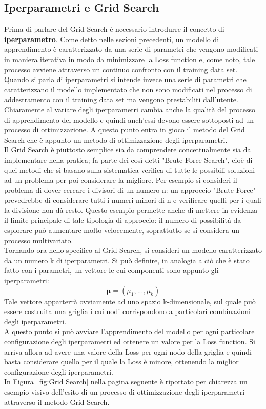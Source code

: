 \newpage

\subsection{Iperparametri e Grid Search}
\label{iperparametri e grid search}

Prima di parlare del Grid Search è necessario introdurre il concetto di \textbf{iperparametro}. Come detto nelle sezioni precedenti, un modello di apprendimento è caratterizzato da una serie di parametri che vengono modificati in maniera iterativa in modo da minimizzare la Loss function e, come noto, tale processo avviene attraverso un continuo confronto con il training data set. Quando si parla di iperparametri si intende invece una serie di parametri che caratterizzano il modello implementato che non sono modificati nel processo di addestramento con il training data set ma vengono prestabiliti dall'utente. \\
Chiaramente al variare degli iperparametri cambia anche la qualità del processo di apprendimento del modello e quindi anch'essi devono essere sottoposti ad un processo di ottimizzazione. A questo punto entra in gioco il metodo del Grid Search che è appunto un metodo di ottimizzazione degli iperparametri. \\
Il Grid Search è piuttosto semplice sia da comprendere concettualmente sia da implementare nella pratica; fa parte dei così detti "Brute-Force Search", cioè di quei metodi che si basano sulla sistematica verifica di tutte le possibili soluzioni ad un problema per poi considerare la migliore. Per esempio si consideri il problema di dover cercare i divisori di un numero n: un approccio "Brute-Force" prevedrebbe di considerare tutti i numeri minori di n e verificare quelli per i quali la divisione non dà resto. Questo esempio permette anche di mettere in evidenza il limite principale di tale tipologia di approccio: il numero di possibilità da esplorare può aumentare molto velocemente, soprattutto se si considera un processo multivariato. \\
Tornando ora nello specifico al Grid Search, si consideri un modello caratterizzato da un numero k di iperparametri. Si può definire, in analogia a ciò che è stato fatto con i parametri, un vettore le cui componenti sono appunto gli iperparametri: 
\begin{equation}
\bm{\mu} = (\mu_1,...,\mu_k)
\end{equation}
Tale vettore apparterrà ovviamente ad uno spazio k-dimensionale, sul quale può essere costruita una griglia i cui nodi corrispondono a particolari combinazioni degli iperparametri. \\
A questo punto si può avviare l'apprendimento del modello per ogni particolare configurazione degli iperparametri ed ottenere un valore per la Loss function. Si arriva allora ad avere una valore della Loss per ogni nodo della griglia e quindi basta considerare quello per il quale la Loss è minore, ottenendo la miglior configurazione degli iperparametri. \\
In Figura~\ref{fig:Grid Search} nella pagina seguente è riportato per chiarezza un esempio visivo dell'esito di un processo di ottimizzazione degli iperparametri attraverso il metodo Grid Search.

